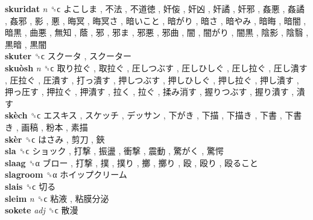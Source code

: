\textbf{skuridat} \emph{n}  ␝ϲ   よこしま ,  不法 ,  不道徳 ,  奸侫 ,  奸凶 ,  奸譎 ,  奸邪 ,  姦悪 ,  姦譎 ,  姦邪 ,  影 ,  悪 ,  晦冥 ,  晦冥さ ,  暗いこと ,  暗がり ,  暗さ ,  暗やみ ,  暗晦 ,  暗闇 ,  暗黒 ,  曲悪 ,  無知 ,  蔭 ,  邪 ,  邪ま ,  邪悪 ,  邪曲 ,  闇 ,  闇がり ,  闇黒 ,  陰影 ,  陰翳 ,  黒暗 ,  黒闇   \\
\textbf{skuter} ␝ϲ   スクータ ,  スクーター   \\
\textbf{skuòsh} \emph{n}  ␝ϲ   取り拉ぐ ,  取拉ぐ ,  圧しつぶす ,  圧しひしぐ ,  圧し拉ぐ ,  圧し潰す ,  圧拉ぐ ,  圧潰す ,  打っ潰す ,  押しつぶす ,  押しひしぐ ,  押し拉ぐ ,  押し潰す ,  押っ圧す ,  押拉ぐ ,  押潰す ,  拉く ,  拉ぐ ,  揉み消す ,  握りつぶす ,  握り潰す ,  潰す   \\
\textbf{skèch} ␝ϲ   エスキス ,  スケッチ ,  デッサン ,  下がき ,  下描 ,  下描き ,  下書 ,  下書き ,  画稿 ,  粉本 ,  素描   \\
\textbf{skèr} ␝ϲ   はさみ ,  剪刀 ,  鋏   \\
\textbf{sla} ␝ϲ   ショック ,  打撃 ,  振盪 ,  衝撃 ,  震動 ,  驚がく ,  驚愕   \\
\textbf{slaag} ␝α   ブロー ,  打撃 ,  撲 ,  撲り ,  擲 ,  擲り ,  殴 ,  殴り ,  殴ること   \\
\textbf{slagroom} ␝α   ホイップクリーム   \\
\textbf{slais} ␝ϲ   切る   \\
\textbf{sleim} \emph{n}  ␝ϲ   粘液 ,  粘膜分泌   \\
\textbf{sokete} \emph{adj}  ␝ϲ   散漫   \\
